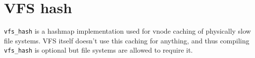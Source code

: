 \section{VFS hash}

\verb+vfs_hash+ is a hashmap implementation used for vnode caching of physically
slow file systems. VFS itself doesn't use this caching for anything, and thus
compiling \verb+vfs_hash+ is optional but file systems are allowed to require it.
